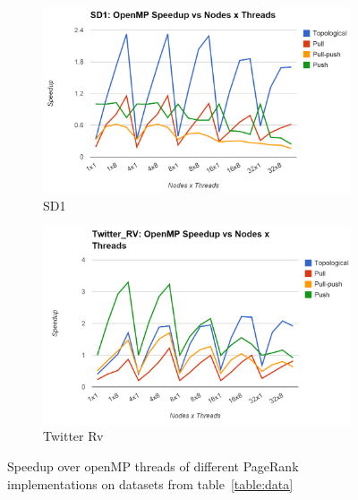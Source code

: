 \documentclass[letterpaper,11pt,onecolumn]{article}
\begin{document}
\begin{appendices}
\begin{figure}[!h]
\begin{subfigure}{.5\textwidth}
  \centering
  \includegraphics[width=.99\linewidth]{SD1OMPSpeedup}
  \caption{SD1}
  \label{fig:lgtime}
\end{subfigure}%
\begin{subfigure}{.5\textwidth}
  \centering
  \includegraphics[width=.99\linewidth]{TwitterRVOMPSpeedup}
  \caption{Twitter Rv}
  \label{fig:ftime}
\end{subfigure}
\caption{Speedup over openMP threads of different PageRank implementations on datasets from table~\ref{table:data}}
\label{fig:spOMP2}
\end{figure}


\end{appendices}
\end{document}
